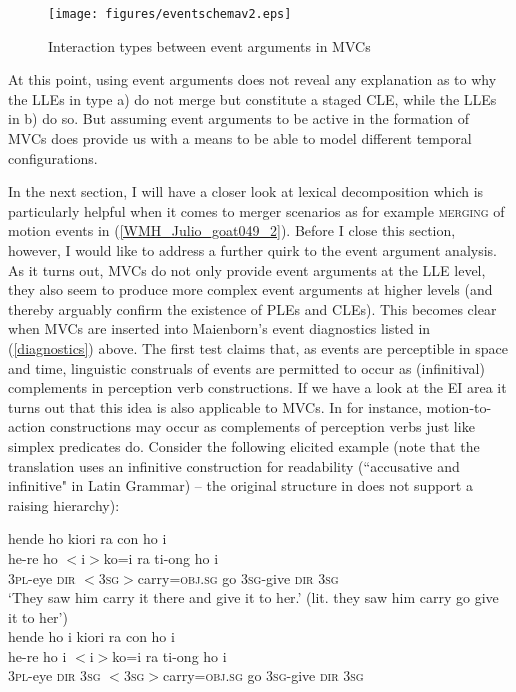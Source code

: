\begin{figure}
\texttt{[image: figures/eventschemav2.eps]} 
\caption{Interaction types between event arguments in MVCs}\label{fig:eventsmod}
\end{figure}

At this point, using event arguments does not reveal any explanation as to why the LLEs in type a) do not merge but constitute a staged CLE, while the LLEs in b) do so. But assuming event arguments to be active in the formation of MVCs does provide us with a means to be able to model different temporal configurations.

In the next section, I will have a closer look at lexical decomposition which is particularly helpful when it comes to  merger scenarios as for example \textsc{merging} of motion events in (\ref{WMH_Julio_goat049_2}). Before I close this section, however, I would like to address a further quirk to the event argument analysis. As it turns out, MVCs do not only provide event arguments at the LLE level, they also seem to produce more complex event arguments at higher levels (and thereby arguably confirm the existence of PLEs and CLEs). This becomes clear when MVCs are inserted into Maienborn's event diagnostics listed in (\ref{diagnostics}) above. The first test claims that, as events are perceptible in space and time, linguistic construals of events are permitted to occur as (infinitival) complements in perception verb constructions. If we have a look at the EI area it turns out that this idea is also applicable to MVCs. In  for instance, motion-to-action constructions may occur as complements of perception verbs just like simplex predicates do. Consider the following elicited example (note that the  translation uses an infinitive construction for readability (``accusative and infinitive" in Latin Grammar) -- the original structure in  does not support a raising hierarchy):
\newpage

\ea \label{hendeho}
\ea
\glll hende ho kiori ra con ho i \\
he-re ho $<$i$>$ko=i ra ti-ong ho i \\
3\textsc{pl}-eye \textsc{dir} $<$3\textsc{sg}$>$carry=\textsc{obj}.\textsc{sg} go 3\textsc{sg}-give \textsc{dir} 3\textsc{sg}\\
\glft `They saw him carry it there and give it to her.' (lit. they saw him carry go give it to her')\\
\ex
\glll *hende ho i kiori ra con ho i\\
he-re ho i $<$i$>$ko=i ra ti-ong ho i \\
3\textsc{pl}-eye \textsc{dir} 3\textsc{sg} $<$3\textsc{sg}$>$carry=\textsc{obj}.\textsc{sg} go 3\textsc{sg}-give \textsc{dir} 3\textsc{sg}\\
\z
\z

